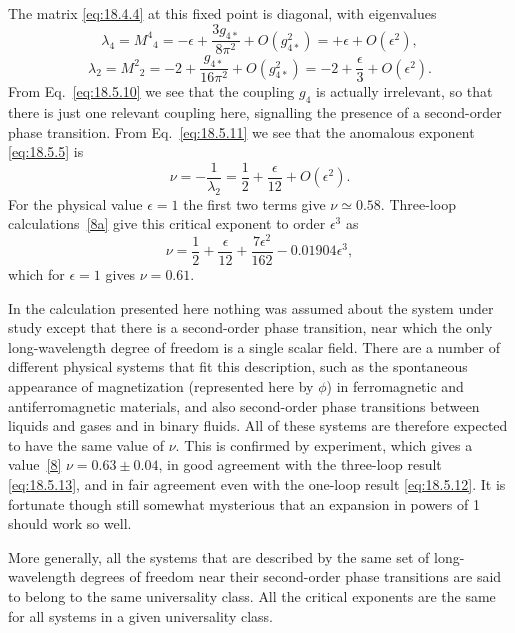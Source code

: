 The matrix \eqref{eq:18.4.4} at this fixed point is diagonal, with eigenvalues
\begin{equation}
\lambda_4=M^4{}_4=-\epsilon+\frac{3g_{4*}}{8\pi^2}
+O(g_{4*}^2)=+\epsilon+O(\epsilon^2),
\tag{18.5.10}\label{eq:18.5.10}
\end{equation}
\begin{equation}
\lambda_2=M^2{}_2=-2+\frac{g_{4*}}{16\pi^2}
+O(g_{4*}^2)=-2+\frac{\epsilon}{3}+O(\epsilon^2).
\tag{18.5.11}\label{eq:18.5.11}
\end{equation}
From Eq.~\eqref{eq:18.5.10} we see that the coupling $g_4$ is actually irrelevant, so that there is just one relevant coupling here, signalling the presence of a second-order phase transition. From Eq.~\eqref{eq:18.5.11} we see that the anomalous exponent \eqref{eq:18.5.5} is
\begin{equation}
\nu=-\frac{1}{\lambda_2}=\frac{1}{2}+\frac{\epsilon}{12}+O(\epsilon^2).
\tag{18.5.12}\label{eq:18.5.12}
\end{equation}
For the physical value $\epsilon=1$ the first two terms give $\nu\simeq0.58$. Three-loop calculations~\hyperref[ch18-ref-8a]{[8a]} give this critical exponent to order $\epsilon^3$ as
\begin{equation}
\nu=\frac{1}{2}+\frac{\epsilon}{12}+\frac{7\epsilon^2}{162}
-0.01904\epsilon^3,
\tag{18.5.13}\label{eq:18.5.13}
\end{equation}
which for $\epsilon=1$ gives $\nu=0.61$.

In the calculation presented here nothing was assumed about the system under study except that there is a second-order phase transition, near which the only long-wavelength degree of freedom is a single scalar field. There are a number of different physical systems that fit this description, such as the spontaneous appearance of magnetization (represented here by $\phi$) in ferromagnetic and antiferromagnetic materials, and also second-order phase transitions between liquids and gases and in binary fluids. All of these systems are therefore expected to have the same value of $\nu$. This is confirmed by experiment, which gives a value~\hyperref[ch18-ref-8]{[8]} $\nu=0.63\pm0.04$, in good agreement with the three-loop result \eqref{eq:18.5.13}, and in fair agreement even with the one-loop result \eqref{eq:18.5.12}. It is fortunate though still somewhat mysterious that an expansion in powers of 1 should work so well.

More generally, all the systems that are described by the same set of long-wavelength degrees of freedom near their second-order phase transitions are said to belong to the same universality class. All the critical exponents are the same for all systems in a given universality class.
